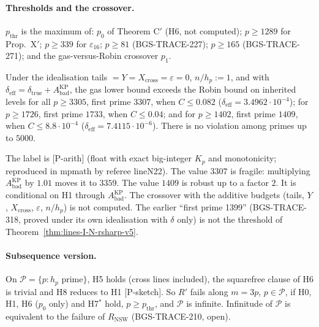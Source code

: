 \paragraph{Thresholds and the crossover.} \(p_{\mathrm{thr}}\) is the maximum of: \(p_0\) of Theorem C\('\) (H6, not computed); \(p\ge1289\) for Prop.~X\('\); \(p\ge339\) for \(\varepsilon_{16}\); \(p\ge81\) (BGS-TRACE-227); \(p\ge165\) (BGS-TRACE-271); and the gas-versus-Robin crossover \(p_1\).
\begin{proposition}
Under the idealisation tails \(=Y=X_{\mathrm{cross}}=\varepsilon=0\), \(n/h_p:=1\), and with \(\delta_{\mathrm{eff}}=\delta_{\mathrm{true}}+A^{\mathrm{KP}}_{\mathrm{bad}}\), the gas lower bound exceeds the Robin bound on inherited levels for all \(p\ge3305\), first prime \(3307\), when \(C\le0.082\) (\(\delta_{\mathrm{eff}}=3.4962\cdot10^{-4}\)); for \(p\ge1726\), first prime \(1733\), when \(C\le0.04\); and for \(p\ge1402\), first prime \(1409\), when \(C\le8.8\cdot10^{-4}\) (\(\delta_{\mathrm{eff}}=7.4115\cdot10^{-6}\)). There is no violation among primes up to \(5000\).
\end{proposition}
The label is [P-arith] (float with exact big-integer \(K_p\) and monotonicity; reproduced in mpmath by referee lineN22). The value \(3307\) is fragile: multiplying \(A^{\mathrm{KP}}_{\mathrm{bad}}\) by \(1.01\) moves it to \(3359\). The value \(1409\) is robust up to a factor \(2\). It is conditional on H1 through \(A^{\mathrm{KP}}_{\mathrm{bad}}\). The crossover with the additive budgets (tails, \(Y\), \(X_{\mathrm{cross}}\), \(\varepsilon\), \(n/h_p\)) is not computed. The earlier ``first prime 1399'' (BGS-TRACE-318, proved under its own idealisation with \(\delta\) only) is not the threshold of Theorem~\ref{thm:lines-I-N-rsharp-v5}.

\paragraph{Subsequence version.} On \(\mathcal P=\{p:h_p\text{ prime}\}\), H5 holds (cross lines included), the squarefree clause of H6 is trivial and H8 reduces to H1 [P-sketch]. So \(R'\) fails along \(m=3p\), \(p\in\mathcal P\), if H0, H1, H6 (\(p_0\) only) and H7\(^*\) hold, \(p\ge p_{\mathrm{thr}}\), and \(\mathcal P\) is infinite. Infinitude of \(\mathcal P\) is equivalent to the failure of \(R_{\mathrm{NSW}}\) (BGS-TRACE-210, open).


